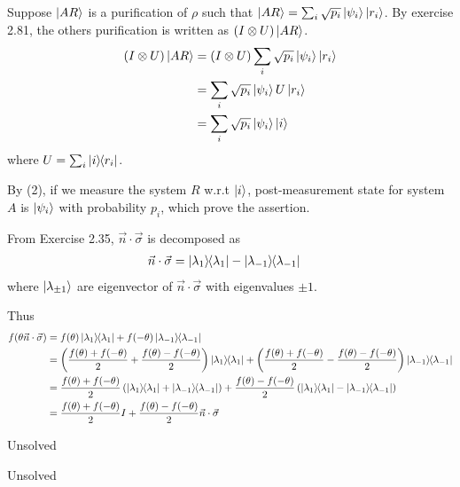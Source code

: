 Suppose $\ket{AR}$ is a purification of $\rho$ such that $\ket{AR} = \sum_i \sqrt{p_i} \ket{\psi_i} \ket{r_i}$.
By exercise 2.81, the others purification is written as $(I \otimes U) \ket{AR}$.
\begin{align*}
	(I \otimes U)  \ket{AR} &= (I \otimes U) \sum_i \sqrt{p_i} \ket{\psi_i} \ket{r_i}\\
		&= \sum_i \sqrt{p_i} \ket{\psi_i} U\ket{r_i}\\
		&= \sum_i \sqrt{p_i} \ket{\psi_i} \ket{i}
\end{align*}
where $U = \sum_i \ket{i}\hspace{-1mm} \bra{r_i}$.

By (2), if we measure the system $R$ w.r.t $\ket{i}$, post-measurement state for system $A$ is $\ket{\psi_i}$ with probability $p_i$, which prove the assertion.




From Exercise 2.35, $\vec{n} \cdot \vec{\sigma}$ is decomposed as
\begin{align*}
	\vec{n} \cdot \vec{\sigma} &= \ket{\lambda_1}\hspace{-1mm} \bra{\lambda_1} - \ket{\lambda_{-1}}\hspace{-1mm} \bra{\lambda_{-1}}
\end{align*}
where $\ket{\lambda_{\pm 1}}$ are eigenvector of $\vec{n} \cdot \vec{\sigma}$ with eigenvalues $\pm 1$.

Thus
\begin{align*}
	f(\theta \vec{n} \cdot \vec{\sigma}) &= f(\theta) \kb{\lambda_1} + f(- \theta) \kb{\lambda_{-1}}\\
		&= \left( \frac{f(\theta) + f(-\theta)}{2} + \frac{f(\theta) - f(-\theta)}{2}  \right) \kb{\lambda_1} + \left( \frac{f(\theta) + f(-\theta)}{2} - \frac{f(\theta) - f(-\theta)}{2}  \right)\kb{\lambda_{-1}}\\
		&= \frac{f(\theta) + f(-\theta)}{2} \left( \kb{\lambda_1} + \kb{\lambda_{-1}} \right) +  \frac{f(\theta) - f(-\theta)}{2} \left(\kb{\lambda_1} - \kb{\lambda_{-1}} \right)\\
		&= \frac{f(\theta) + f(-\theta)}{2} I + \frac{f(\theta) - f(-\theta)}{2} \vec{n} \cdot \vec{\sigma}
\end{align*}

Unsolved

Unsolved
